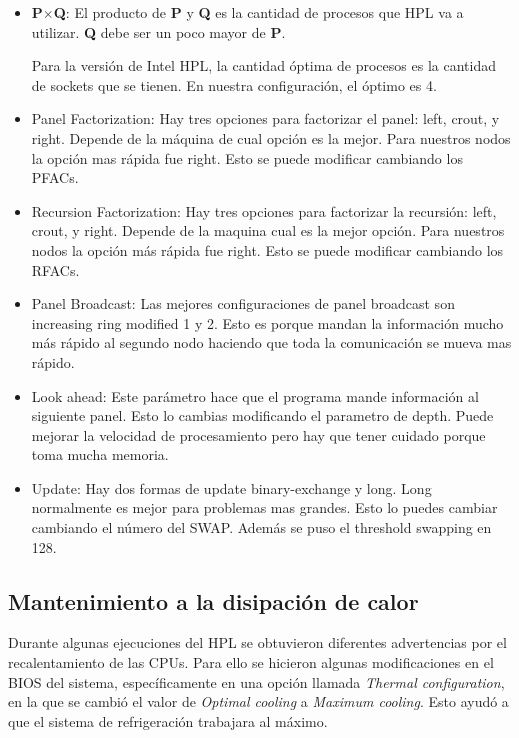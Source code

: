\begin{itemize}
	\item \textbf{P$\times$Q}: El producto de \textbf{P} y \textbf{Q} es la cantidad de procesos que HPL va a utilizar. \textbf{Q} debe ser un poco mayor de \textbf{P}.
	
	Para la versión de Intel HPL, la cantidad óptima de procesos es la cantidad de sockets que se tienen. En nuestra configuración, el óptimo es 4.
	
	\item Panel Factorization: Hay tres opciones para factorizar el panel: left, crout, y right. Depende de la máquina de cual opción es la mejor. Para nuestros nodos la opción mas rápida fue right. Esto se puede modificar cambiando los PFACs.
    \item Recursion Factorization: Hay tres opciones para factorizar la recursión: left, crout, y right. Depende de la maquina cual es la mejor opción. Para nuestros nodos la opción más rápida fue right. Esto se puede modificar cambiando los RFACs.
    \item Panel Broadcast: Las mejores configuraciones de panel broadcast son increasing ring modified 1 y 2. Esto es porque mandan la información mucho más rápido al segundo nodo haciendo que toda la comunicación se mueva mas rápido.
    \item Look ahead: Este parámetro hace que el programa mande información al siguiente panel. Esto lo cambias modificando el parametro de depth. Puede mejorar la velocidad de procesamiento pero hay que tener cuidado porque toma mucha memoria.
    \item Update: Hay dos formas de update binary-exchange y long. Long normalmente es mejor para problemas mas grandes. Esto lo puedes cambiar cambiando el número del SWAP. Además se puso el threshold swapping en 128.
	
\end{itemize}

\subsection{Mantenimiento a la disipación de calor}
Durante algunas ejecuciones del HPL se obtuvieron diferentes advertencias por el recalentamiento de las CPUs. Para ello se hicieron algunas modificaciones en el BIOS del sistema, específicamente en una opción llamada \textit{Thermal configuration}, en la que se cambió el valor de \textit{Optimal cooling} a \textit{Maximum cooling}. Esto ayudó a que el sistema de refrigeración trabajara al máximo.

